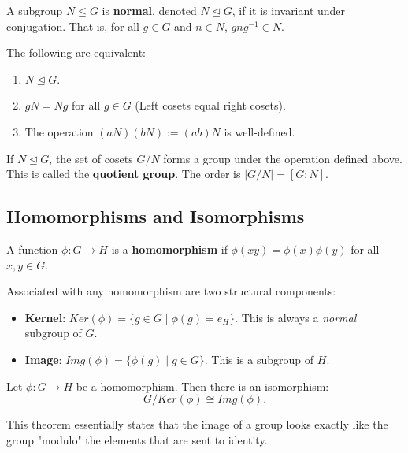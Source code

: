 \begin{definition}
A subgroup $N \leq G$ is \textbf{normal}, denoted $N \trianglelefteq G$, if it is invariant under conjugation. That is, for all $g \in G$ and $n \in N$, $gng^{-1} \in N$.
\end{definition}

\begin{proposition}
The following are equivalent:
\begin{enumerate}
    \item $N \trianglelefteq G$.
    \item $gN = Ng$ for all $g \in G$ (Left cosets equal right cosets).
    \item The operation $(aN)(bN) := (ab)N$ is well-defined.
\end{enumerate}
\end{proposition}

\begin{definition}
If $N \trianglelefteq G$, the set of cosets $G/N$ forms a group under the operation defined above. This is called the \textbf{quotient group}. The order is $|G/N| = [G:N]$.
\end{definition}

\subsection{Homomorphisms and Isomorphisms}

\begin{definition}[Homomorphism]
A function $\phi: G \to H$ is a \textbf{homomorphism} if $\phi(xy) = \phi(x)\phi(y)$ for all $x, y \in G$.
\end{definition}

Associated with any homomorphism are two structural components:
\begin{itemize}
    \item \textbf{Kernel}: $Ker(\phi) = \{g \in G \mid \phi(g) = e_H\}$. This is always a \textit{normal} subgroup of $G$.
    \item \textbf{Image}: $Img(\phi) = \{\phi(g) \mid g \in G\}$. This is a subgroup of $H$.
\end{itemize}

\begin{theorem}
Let $\phi: G \to H$ be a homomorphism. Then there is an isomorphism:
\[ G / Ker(\phi) \cong Img(\phi). \]
\end{theorem}
This theorem essentially states that the image of a group looks exactly like the group "modulo" the elements that are sent to identity.

